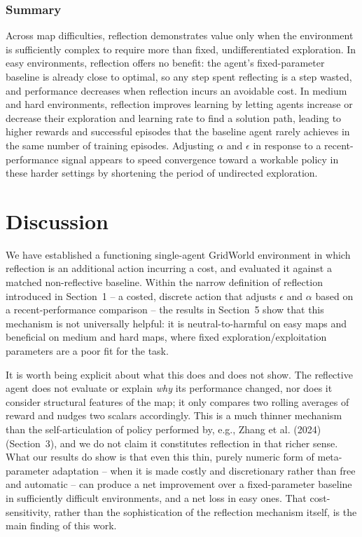 \documentclass[11pt]{article}
\begin{document}
\subsubsection{Summary}

Across map difficulties, reflection demonstrates value only when the environment is sufficiently complex to require more than fixed, undifferentiated exploration. In easy environments, reflection offers no benefit: the agent's fixed-parameter baseline is already close to optimal, so any step spent reflecting is a step wasted, and performance decreases when reflection incurs an avoidable cost. In medium and hard environments, reflection improves learning by letting agents increase or decrease their exploration and learning rate to find a solution path, leading to higher rewards and successful episodes that the baseline agent rarely achieves in the same number of training episodes. Adjusting $\alpha$ and $\epsilon$ in response to a recent-performance signal appears to speed convergence toward a workable policy in these harder settings by shortening the period of undirected exploration.

\section{Discussion}

We have established a functioning single-agent GridWorld environment in which reflection is an additional action incurring a cost, and evaluated it against a matched non-reflective baseline. Within the narrow definition of reflection introduced in Section~1 -- a costed, discrete action that adjusts $\epsilon$ and $\alpha$ based on a recent-performance comparison -- the results in Section~5 show that this mechanism is not universally helpful: it is neutral-to-harmful on easy maps and beneficial on medium and hard maps, where fixed exploration/exploitation parameters are a poor fit for the task.

It is worth being explicit about what this does and does not show. The reflective agent does not evaluate or explain \emph{why} its performance changed, nor does it consider structural features of the map; it only compares two rolling averages of reward and nudges two scalars accordingly. This is a much thinner mechanism than the self-articulation of policy performed by, e.g., Zhang et al. (2024) (Section~3), and we do not claim it constitutes reflection in that richer sense. What our results do show is that even this thin, purely numeric form of meta-parameter adaptation -- when it is made costly and discretionary rather than free and automatic -- can produce a net improvement over a fixed-parameter baseline in sufficiently difficult environments, and a net loss in easy ones. That cost-sensitivity, rather than the sophistication of the reflection mechanism itself, is the main finding of this work.
\end{document}
